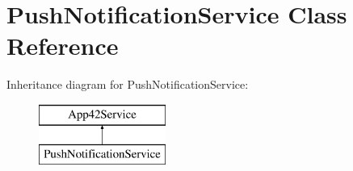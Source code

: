 \hypertarget{class_push_notification_service}{\section{Push\+Notification\+Service Class Reference}
\label{class_push_notification_service}
}
Inheritance diagram for Push\+Notification\+Service\+:\begin{figure}[H]
\begin{center}
\leavevmode
\includegraphics[height=2.000000cm]{class_push_notification_service}
\end{center}
\end{figure}
